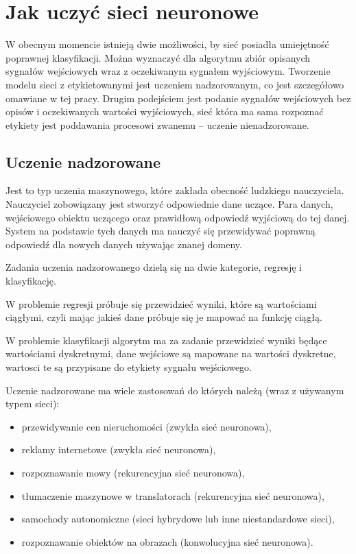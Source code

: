 \documentclass[12pt,a4paper,twoside,titlepage,openright]{book}
\begin{document}
\section{Jak uczyć sieci neuronowe}
W obecnym momencie istnieją dwie możliwości, by sieć posiadła umiejętność poprawnej klasyfikacji. Można wyznaczyć dla algorytmu zbiór opisanych sygnałów wejściowych wraz z oczekiwanym sygnałem wyjściowym. Tworzenie modelu sieci z etykietowanymi jest uczeniem nadzorowanym, co jest szczegółowo omawiane w tej pracy. Drugim podejściem jest podanie sygnałów wejściowych bez opisów i oczekiwanych wartości wyjściowych, sieć która ma sama rozpoznać etykiety jest poddawania procesowi zwanemu -- uczenie nienadzorowane.

\subsection*{Uczenie nadzorowane}
Jest to typ uczenia maszynowego, które zakłada obecność ludzkiego nauczyciela. Nauczyciel zobowiązany jest stworzyć odpowiednie dane uczące. Para danych, wejściowego obiektu uczącego oraz prawidłową odpowiedź wyjściową do tej danej. System na podstawie tych danych ma nauczyć się przewidywać poprawną odpowiedź dla nowych danych używając znanej domeny.

Zadania uczenia nadzorowanego dzielą się na dwie kategorie, regresję i klasyfikację. 

W problemie regresji próbuje się przewidzieć wyniki, które są wartościami ciągłymi, czyli mając jakieś dane próbuje się je mapować na funkcję ciągłą. 

W problemie klasyfikacji algorytm ma za zadanie przewidzieć wyniki będące wartościami dyskretnymi, dane wejściowe są mapowane na wartości dyskretne, wartosci te są przypisane do etykiety sygnału wejściowego.\cite{Gron:2017:HML:3153997}

Uczenie nadzorowane ma wiele zastosowań do których należą (wraz z używanym typem sieci):
\begin{itemize}
\item przewidywanie cen nieruchomości (zwykła sieć neuronowa),
\item reklamy internetowe (zwykła sieć neuronowa),
\item rozpoznawanie mowy (rekurencyjna sieć neuronowa),
\item tłumaczenie maszynowe w translatorach (rekurencyjna sieć neuronowa),
\item samochody autonomiczne (sieci hybrydowe lub inne niestandardowe sieci),
\item rozpoznawanie obiektów na obrazach (konwolucyjna sieć neuronowa).
\end{itemize}
\end{document}
